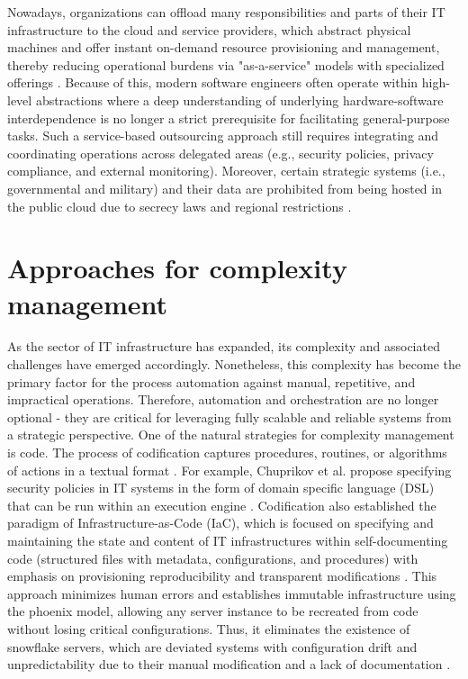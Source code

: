 Nowadays, organizations can offload many responsibilities and parts of their IT infrastructure to the cloud and service providers, which abstract physical machines and offer instant on-demand resource provisioning and management, thereby reducing operational burdens via "as-a-service" models with specialized offerings \cite[Sec. 3.3]{alghofaili2021secure}. Because of this, modern software engineers often operate within high-level abstractions where a deep understanding of underlying hardware-software interdependence is no longer a strict prerequisite for facilitating general-purpose tasks. Such a service-based outsourcing approach still requires integrating and coordinating operations across delegated areas (e.g., security policies, privacy compliance, and external monitoring). Moreover, certain strategic systems (i.e., governmental and military) and their data are prohibited from being hosted in the public cloud due to secrecy laws and regional restrictions \cite[Sec. 3.4]{alghofaili2021secure}.

\section{Approaches for complexity management}

As the sector of IT infrastructure has expanded, its complexity and associated challenges have emerged accordingly. Nonetheless, this complexity has become the primary factor for the process automation against manual, repetitive, and impractical operations. Therefore, automation and orchestration are no longer optional - they are critical for leveraging fully scalable and reliable systems from a strategic perspective. One of the natural strategies for complexity management is code. The process of codification captures procedures, routines, or algorithms of actions in a textual format \cite[pp. 1–2]{ouriques2023role}. For example, Chuprikov et al. propose specifying security policies in IT systems in the form of domain specific language (DSL) that can be run within an execution engine \cite{chuprikov2025security}. Codification also established the paradigm of Infrastructure-as-Code (IaC), which is focused on specifying and maintaining the state and content of IT infrastructures within self-documenting code (structured files with metadata, configurations, and procedures) with emphasis on provisioning reproducibility and transparent modifications \cite{pahl2025infrastructure}. This approach minimizes human errors and establishes immutable infrastructure using the phoenix model, allowing any server instance to be recreated from code without losing critical configurations. Thus, it eliminates the existence of snowflake servers, which are deviated systems with configuration drift and unpredictability due to their manual modification and a lack of documentation \cite[Ch. 2]{morris2020infrastructure}. 


